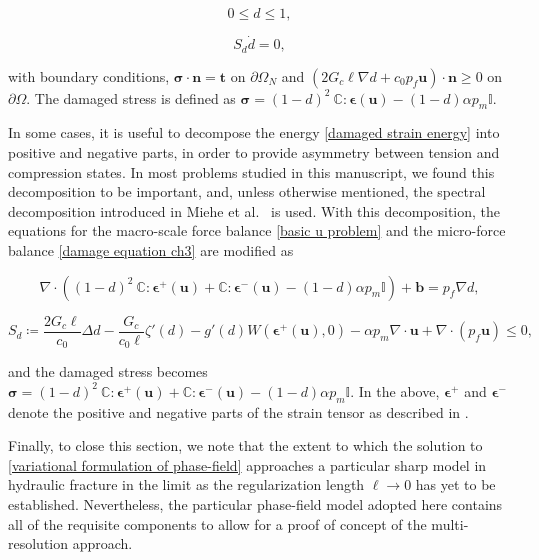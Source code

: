 \begin{equation}
   0 \le d \le 1,
\end{equation}

\begin{equation}
    S_d\dot{d} = 0,
    \label{eq:ddot-strong}
\end{equation}

with boundary conditions, $\boldsymbol\sigma \cdot \textbf{n} = \textbf{t}$ on $\partial \Omega_N$ and $(2G_c\ell\nabla d +c_0p_f\textbf{u})\cdot \textbf{n} \ge 0$ on $\partial \Omega$. The damaged stress is defined as $\boldsymbol\sigma = (1-d)^2\ \mathbb{C}:\boldsymbol\epsilon(\textbf{u}) -(1-d)\alpha p_m \mathbb{I}$.

In some cases, it is useful to decompose the energy \eqref{damaged strain energy} into positive and negative parts, in order to provide asymmetry between tension and compression states. In most problems studied in this manuscript, we found this decomposition to be important, and, unless otherwise mentioned, the spectral decomposition introduced in Miehe et al.~\cite{miehe2010phase} is used. With this decomposition, the equations for the macro-scale force balance \eqref{basic u problem} and the micro-force balance \eqref{damage equation ch3} are modified as

\begin{equation}\label{basic u problem spectral}\tag{3.22a}
    \nabla \cdot \left( (1-d)^2\ \mathbb{C}:\boldsymbol\epsilon^+(\textbf{u}) + \mathbb{C}:\boldsymbol\epsilon^-(\textbf{u})-(1-d)\alpha p_m \mathbb{I}\right) + \textbf{b} = p_f\nabla d, 
\end{equation}

\begin{equation}\label{damage equation spectral}\tag{3.23a}
    S_d \coloneqq  \dfrac{2G_c\ell}{c_0}\Delta d - \dfrac{G_c}{c_0\ell}\zeta'(d)-g'(d)W(\boldsymbol{\epsilon^+}(\boldsymbol{\textbf{u}}),0) - \alpha p_m\nabla \cdot \textbf{u} + \nabla \cdot (p_f\textbf{u}) \le 0,
\end{equation}

and the damaged stress becomes $\boldsymbol\sigma = (1-d)^2\ \mathbb{C}:\boldsymbol\epsilon^+(\textbf{u}) + \mathbb{C}:\boldsymbol\epsilon^-(\textbf{u})-(1-d)\alpha p_m \mathbb{I}$. In the above, $\boldsymbol\epsilon^+$ and $\boldsymbol\epsilon^-$ denote the positive and negative parts of the strain tensor as described in \cite{miehe2010phase}. 

Finally, to close this section, we note that the extent to which the solution to \eqref{variational formulation of phase-field} approaches a particular sharp model in hydraulic fracture in the limit as the regularization length $\ell\rightarrow 0$ has yet to be established.  Nevertheless, the particular phase-field model adopted here contains all of the requisite components to allow for a proof of concept of the multi-resolution approach.  




